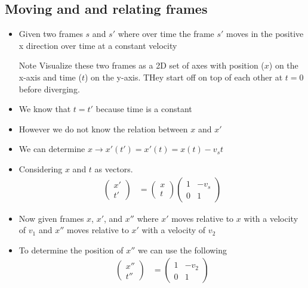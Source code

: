\documentclass[12pt,letterpaper, twocolumn]{article}
\begin{document}
\subsection{Moving and and relating frames}
\begin{itemize}
    \item Given two frames $s$ and $s'$ where over time the frame $s'$ moves in the positive x direction over time at a constant velocity 
    \item[Note] Visualize these two frames as a 2D set of axes with position ($x$) on the x-axis and time ($t$) on the y-axis. THey start off on top of each other at $t=0$ before diverging. 
    \item We know that $t=t'$ because time is a constant
    \item However we do not know the relation between $x$ and $x'$
    \item We can determine $x \rightarrow x'(t') = x'(t) = x(t) -v_s t$
    \item Considering $x$ and $t$ as vectors. 
    \begin{align*}
        \begin{pmatrix}
               x' \\
               t' 
             \end{pmatrix}
             &=  \begin{pmatrix}
                x \\
                t 
              \end{pmatrix}
              \begin{pmatrix}
                1 & -v_s \\
                0 & 1 
              \end{pmatrix}
      \end{align*}
      \item Now given frames $x$, $x'$, and $x''$ where $x'$ moves relative to $x$ with a velocity of $v_1$ and $x''$ moves relative to $x'$ with a velocity of $v_2$
      \item To determine the position of $x''$ we can use the following
      \begin{align*}
        \begin{pmatrix}
            x''\\t''
        \end{pmatrix} &=
        \begin{pmatrix}
            1&-v_2\\0&1
        \end{pmatrix}

\end{align*}
\end{itemize}
\end{document}
